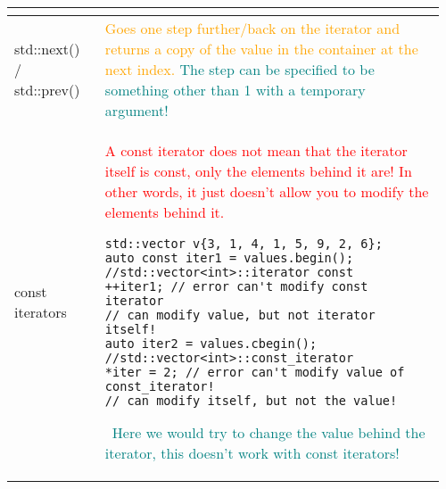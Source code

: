 \documentclass[main.tex,fontsize=8pt,paper=a4,paper=portrait,DIV=calc]{scrartcl}
\begin{document}
\begin{table}[ht!]
\begin{tabular}{|m{0.2\linewidth}|m{0.755\linewidth}|}
\begin{itemize}
\vspace{-2mm}
\end{itemize} \\
\hline
std::next() / std::prev() & 
\textcolor{orange}{Goes one step further/back on the iterator and returns a copy of the value in the container at the next index.}\newline
\textcolor{teal}{The step can be specified to be something other than 1 with a temporary argument!}\\
\hline
const iterators & 
\textcolor{red}{A const iterator does not mean that the iterator itself is const, only the elements behind it are! In other words, it just doesn't allow you to modify the elements behind it.}\newline
\begin{lstlisting}
std::vector v{3, 1, 4, 1, 5, 9, 2, 6};
auto const iter1 = values.begin(); //std::vector<int>::iterator const
++iter1; // error can't modify const iterator
// can modify value, but not iterator itself!
auto iter2 = values.cbegin(); //std::vector<int>::const_iterator
*iter = 2; // error can't modify value of const_iterator!
// can modify itself, but not the value!
\end{lstlisting}
\, \newline
\textcolor{teal}{Here we would try to change the value behind the iterator, this doesn't work with const iterators!}\\
\hline
\end{tabular}

\end{table}
\end{document}
